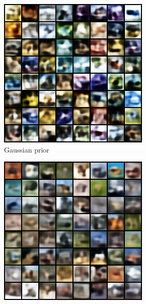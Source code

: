 \documentclass{article}
\begin{document}
\begin{figure}
    \centering
    \begin{subfigure}{.33\textwidth}
    \includegraphics[width=.99\textwidth]{figures/classical_CIFAR10.png}
    \caption{Gaussian prior}\label{fig:CIFAR10_classical}
    \end{subfigure}
    \begin{subfigure}{.33\textwidth}
    \includegraphics[width=.99\textwidth]{figures/NF_CIFAR10.png}

\end{subfigure}
\end{figure}
\end{document}
